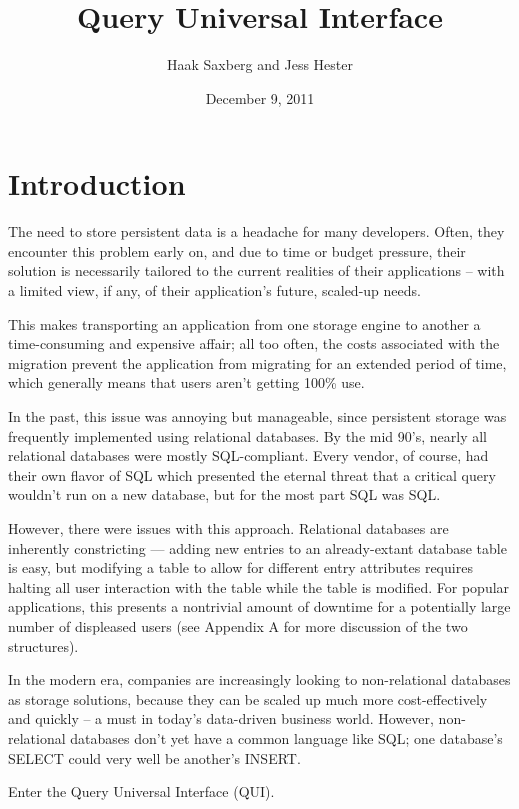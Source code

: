 \documentclass{article} %
\title{Query Universal Interface}
\author{Haak Saxberg and Jess Hester}
\date{December 9, 2011}
\begin{document}
\maketitle
\newpage

\tableofcontents
\lstlistoflistings
\listoffigures

\newpage
\section{Introduction}
The need to store persistent data is a headache for many developers. Often, they encounter this problem early on, and due to time
or budget pressure, their solution is necessarily tailored to the current realities of their applications -- with a limited view, if any, of 
their application's future, scaled-up needs.

This makes transporting an application from one storage engine to another a time-consuming and expensive affair; all too often, the
costs associated with the migration prevent the application from migrating for an extended period of time, which generally means that
users aren't getting 100\% use.

In the past, this issue was annoying but manageable, since persistent storage was frequently implemented using relational databases.
By the mid 90's, nearly all relational databases were mostly SQL-compliant. Every vendor, of course, had their own flavor of SQL which
presented the eternal threat that a critical query wouldn't run on a new database, but for the most part SQL was SQL.

However, there were issues with this approach. Relational databases are inherently constricting --- adding new entries to an already-extant 
database table is easy, but modifying a table to allow for different entry attributes requires halting all user interaction with the table while
the table is modified. For popular applications, this presents a nontrivial amount of downtime for a potentially large number of displeased 
users (see Appendix A for more discussion of the two structures).

In the modern era, companies are increasingly looking to non-relational databases as storage solutions, because they can be scaled up
much more cost-effectively and quickly -- a must in today's data-driven business world. However, non-relational databases don't yet have
a common language like SQL; one database's SELECT could very well be another's INSERT.

Enter the Query Universal Interface (QUI).
\end{document}
